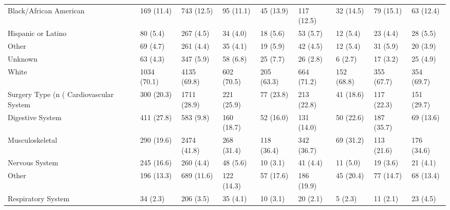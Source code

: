 \begin{table}
\begin{tabular}[t]{lllllllll}
\addlinespace
Black/African American & 169 (11.4) & 743 (12.5) & 95 (11.1) & 45 (13.9) & 117 (12.5) & 32 (14.5) & 79 (15.1) & 63 (12.4)\\
Hispanic or Latino & 80 (5.4) & 267 (4.5) & 34 (4.0) & 18 (5.6) & 53 (5.7) & 12 (5.4) & 23 (4.4) & 28 (5.5)\\
Other & 69 (4.7) & 261 (4.4) & 35 (4.1) & 19 (5.9) & 42 (4.5) & 12 (5.4) & 31 (5.9) & 20 (3.9)\\
Unknown & 63 (4.3) & 347 (5.9) & 58 (6.8) & 25 (7.7) & 26 (2.8) & 6 (2.7) & 17 (3.2) & 25 (4.9)\\
White & 1034 (70.1) & 4135 (69.8) & 602 (70.5) & 205 (63.3) & 664 (71.2) & 152 (68.8) & 355 (67.7) & 354 (69.7)\\
\addlinespace
Surgery Type (n (%
Cardiovascular System & 300 (20.3) & 1711 (28.9) & 221 (25.9) & 77 (23.8) & 213 (22.8) & 41 (18.6) & 117 (22.3) & 151 (29.7)\\
Digestive System & 411 (27.8) & 583 (9.8) & 160 (18.7) & 52 (16.0) & 131 (14.0) & 50 (22.6) & 187 (35.7) & 69 (13.6)\\
Musculoskeletal & 290 (19.6) & 2474 (41.8) & 268 (31.4) & 118 (36.4) & 342 (36.7) & 69 (31.2) & 113 (21.6) & 176 (34.6)\\
Nervous System & 245 (16.6) & 260 (4.4) & 48 (5.6) & 10 (3.1) & 41 (4.4) & 11 (5.0) & 19 (3.6) & 21 (4.1)\\
\addlinespace
Other & 196 (13.3) & 689 (11.6) & 122 (14.3) & 57 (17.6) & 186 (19.9) & 45 (20.4) & 77 (14.7) & 68 (13.4)\\
Respiratory System & 34 (2.3) & 206 (3.5) & 35 (4.1) & 10 (3.1) & 20 (2.1) & 5 (2.3) & 11 (2.1) & 23 (4.5)\\
\bottomrule
\end{tabular}
\end{table}
